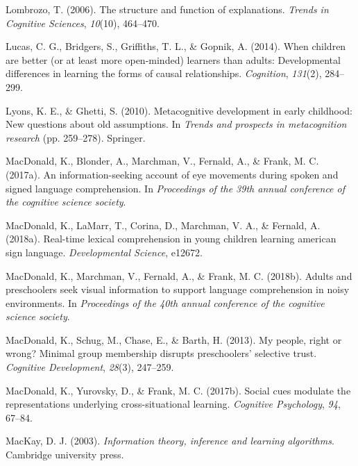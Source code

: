 \documentclass[oneside]{report}
\begin{document}
\leavevmode\hypertarget{ref-lombrozo2006structure}{}%
Lombrozo, T. (2006). The structure and function of explanations.
\emph{Trends in Cognitive Sciences}, \emph{10}(10), 464--470.

\leavevmode\hypertarget{ref-lucas2014children}{}%
Lucas, C. G., Bridgers, S., Griffiths, T. L., \& Gopnik, A. (2014). When
children are better (or at least more open-minded) learners than adults:
Developmental differences in learning the forms of causal relationships.
\emph{Cognition}, \emph{131}(2), 284--299.

\leavevmode\hypertarget{ref-lyons2010metacognitive}{}%
Lyons, K. E., \& Ghetti, S. (2010). Metacognitive development in early
childhood: New questions about old assumptions. In \emph{Trends and
prospects in metacognition research} (pp. 259--278). Springer.

\leavevmode\hypertarget{ref-macdonald2017info}{}%
MacDonald, K., Blonder, A., Marchman, V., Fernald, A., \& Frank, M. C.
(2017a). An information-seeking account of eye movements during spoken
and signed language comprehension. In \emph{Proceedings of the 39th
annual conference of the cognitive science society}.

\leavevmode\hypertarget{ref-macdonald2018real}{}%
MacDonald, K., LaMarr, T., Corina, D., Marchman, V. A., \& Fernald, A.
(2018a). Real-time lexical comprehension in young children learning
american sign language. \emph{Developmental Science}, e12672.

\leavevmode\hypertarget{ref-macdonald2018noise}{}%
MacDonald, K., Marchman, V., Fernald, A., \& Frank, M. C. (2018b).
Adults and preschoolers seek visual information to support language
comprehension in noisy environments. In \emph{Proceedings of the 40th
annual conference of the cognitive science society}.

\leavevmode\hypertarget{ref-macdonald2013my}{}%
MacDonald, K., Schug, M., Chase, E., \& Barth, H. (2013). My people,
right or wrong? Minimal group membership disrupts preschoolers'
selective trust. \emph{Cognitive Development}, \emph{28}(3), 247--259.

\leavevmode\hypertarget{ref-macdonald2017social}{}%
MacDonald, K., Yurovsky, D., \& Frank, M. C. (2017b). Social cues
modulate the representations underlying cross-situational learning.
\emph{Cognitive Psychology}, \emph{94}, 67--84.

\leavevmode\hypertarget{ref-mackay2003information}{}%
MacKay, D. J. (2003). \emph{Information theory, inference and learning
algorithms}. Cambridge university press.
\end{document}
